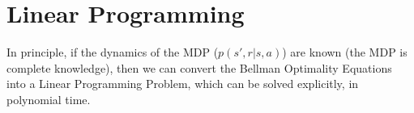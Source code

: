 \documentclass[12pt]{report}
\begin{document}





\section{Linear Programming}
In principle, if the dynamics of the MDP ($p(s', r | s, a)$) are known (the MDP is complete knowledge), then we can convert the Bellman Optimality Equations into a Linear Programming Problem, which can be solved explicitly, in polynomial time.
\end{document}
